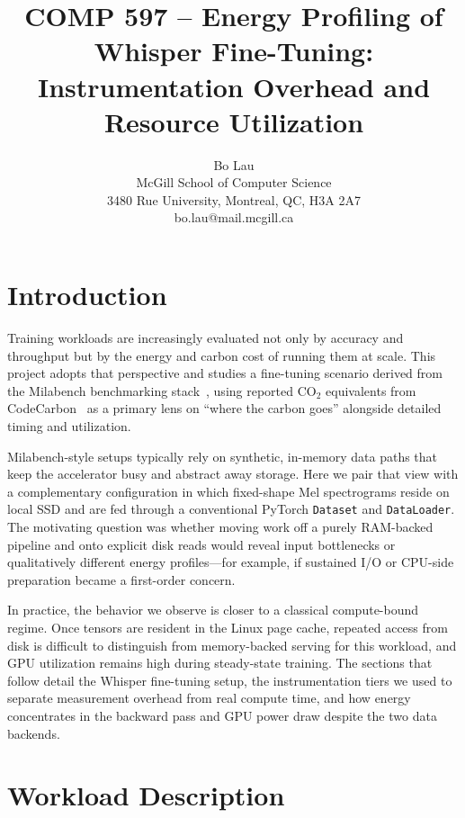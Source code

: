 \documentclass[10pt,twocolumn]{article}
\title{COMP 597 -- Energy Profiling of Whisper Fine-Tuning:\\Instrumentation Overhead and Resource Utilization}
\author{Bo Lau\\McGill School of Computer Science\\3480 Rue University, Montreal, QC, H3A 2A7\\bo.lau@mail.mcgill.ca}
\date{}
\begin{document}
\raggedbottom
\maketitle

\section{Introduction}

Training workloads are increasingly evaluated not only by accuracy and throughput but by the energy and carbon cost of running them at scale. This project adopts that perspective and studies a fine-tuning scenario derived from the Milabench benchmarking stack~\cite{milabench}, using reported CO$_2$ equivalents from CodeCarbon~\cite{codecarbon} as a primary lens on ``where the carbon goes'' alongside detailed timing and utilization.

Milabench-style setups typically rely on synthetic, in-memory data paths that keep the accelerator busy and abstract away storage. Here we pair that view with a complementary configuration in which fixed-shape Mel spectrograms reside on local SSD and are fed through a conventional PyTorch \texttt{Dataset} and \texttt{DataLoader}. The motivating question was whether moving work off a purely RAM-backed pipeline and onto explicit disk reads would reveal input bottlenecks or qualitatively different energy profiles---for example, if sustained I/O or CPU-side preparation became a first-order concern.

In practice, the behavior we observe is closer to a classical compute-bound regime. Once tensors are resident in the Linux page cache, repeated access from disk is difficult to distinguish from memory-backed serving for this workload, and GPU utilization remains high during steady-state training. The sections that follow detail the Whisper fine-tuning setup, the instrumentation tiers we used to separate measurement overhead from real compute time, and how energy concentrates in the backward pass and GPU power draw despite the two data backends.

\section{Workload Description}
\end{document}
